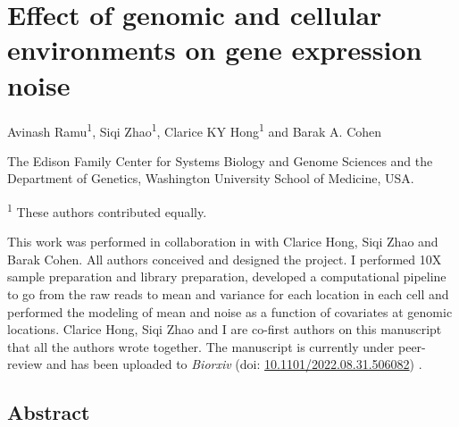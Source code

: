 \chapter{Effect of genomic and cellular environments on gene expression noise}
\label{chap:cas}

\vspace{0.2in}

Avinash Ramu\textsuperscript{1}, Siqi Zhao\textsuperscript{1}, Clarice KY Hong\textsuperscript{1} and Barak A. Cohen

\vspace{0.2in}

The Edison Family Center for Systems Biology and Genome Sciences and the Department of Genetics, Washington University School of Medicine, USA. 

\textsuperscript{1} These authors contributed equally.

\vspace{2in}

This work was performed in collaboration in with Clarice Hong, Siqi Zhao and Barak Cohen. All authors conceived and designed the project. I performed 10X sample preparation and library preparation, developed a computational pipeline to go from the raw reads to mean and variance for each location in each cell and performed the modeling of mean and noise as a function of covariates at genomic locations. Clarice Hong, Siqi Zhao and I are co-first authors on this manuscript that all the authors wrote together. The manuscript is currently under peer-review and has been uploaded to \textit{Biorxiv} (doi: \href{https://www.biorxiv.org/content/10.1101/2022.08.31.506082v1}{10.1101/2022.08.31.506082}) \cite{hongcky_cohenba:EffectGenomic2022}.

\newpage
\section{Abstract}

